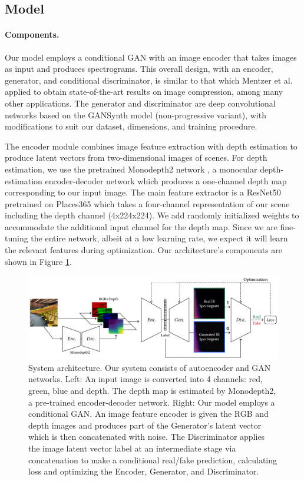 \documentclass[10pt,twocolumn,letterpaper]{article}
\begin{document}
\subsection{Model}

\paragraph{Components.}
Our model employs a conditional GAN with an image encoder that takes images as input and produces spectrograms. This overall design, with an encoder, generator, and conditional discriminator, is similar to that which Mentzer et al. \cite{mentzer2020high} applied to obtain state-of-the-art results on image compression, among many other applications. The generator and discriminator are deep convolutional networks based on the GANSynth \cite{engel2018gansynth} model (non-progressive variant), with modifications to suit our dataset, dimensions, and training procedure.

The encoder module combines image feature extraction with depth estimation to produce latent vectors from two-dimensional images of scenes. For depth estimation, we use the pretrained Monodepth2 network \cite{monodepth2}, a monocular depth-estimation encoder-decoder network which produces a one-channel depth map corresponding to our input image. The main feature extractor is a ResNet50 \cite{he2016deep} pretrained on Places365 \cite{Zhou2014} which takes a four-channel representation of our scene including the depth channel (4x224x224). We add randomly initialized weights to accommodate the additional input channel for the depth map. Since we are fine-tuning the entire network, albeit at a low learning rate, we expect it will learn the relevant features during optimization. Our architecture's components are shown in Figure \ref{fig:arch_summary}.

\begin{figure}
    \centering
    \includegraphics[width=\textwidth]{image2reverb_archsummary2.png}
    \caption{System architecture. Our system consists of autoencoder and GAN networks. Left: An input image is converted into 4 channels: red, green, blue and depth. The depth map is estimated by Monodepth2, a pre-trained encoder-decoder network. Right: Our model employs a conditional GAN. An image feature encoder is given the RGB and depth images and produces part of the Generator's latent vector which is then concatenated with noise. The Discriminator applies the image latent vector label at an intermediate stage via concatenation to make a conditional real/fake prediction, calculating loss and optimizing the Encoder, Generator, and Discriminator.}
    \label{fig:arch_summary}
\end{figure}
\end{document}
